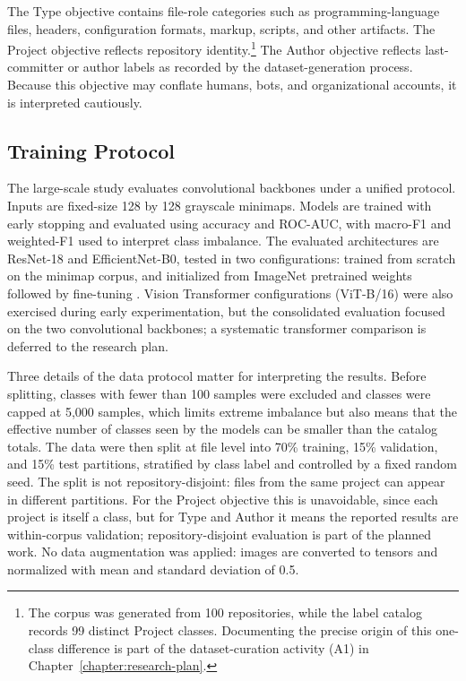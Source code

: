The Type objective contains file-role categories such as programming-language
files, headers, configuration formats, markup, scripts, and other artifacts. The
Project objective reflects repository identity.\footnote{The corpus was
generated from 100 repositories, while the label catalog records 99 distinct
Project classes. Documenting the precise origin of this one-class difference is
part of the dataset-curation activity (A1) in
Chapter~\ref{chapter:research-plan}.} The Author objective reflects
last-committer or author labels as recorded by the dataset-generation process.
Because this objective may conflate humans, bots, and organizational accounts,
it is interpreted cautiously.

\subsection{Training Protocol}

The large-scale study evaluates convolutional backbones under a unified
protocol. Inputs are fixed-size 128 by 128 grayscale minimaps. Models are
trained with early stopping and evaluated using accuracy and ROC-AUC, with
macro-F1 and weighted-F1 used to interpret class imbalance. The evaluated
architectures are ResNet-18 and EfficientNet-B0, tested in two
configurations: trained from scratch on the minimap corpus, and initialized
from ImageNet pretrained weights followed by fine-tuning
\cite{he2016resnet,tan2019efficientnet}. Vision Transformer configurations
(ViT-B/16) were also exercised during early experimentation, but the
consolidated evaluation focused on the two convolutional backbones; a
systematic transformer comparison is deferred to the research plan.

Three details of the data protocol matter for interpreting the results. Before splitting, classes with
fewer than 100 samples were excluded and classes were capped at 5,000 samples,
which limits extreme imbalance but also means that the effective number of
classes seen by the models can be smaller than the catalog totals. The data
were then split at file level into 70\% training, 15\% validation, and 15\%
test partitions, stratified by class label and controlled by a fixed random
seed. The split is not repository-disjoint: files from the same project can
appear in different partitions. For the Project objective this is unavoidable,
since each project is itself a class, but for Type and Author it means the
reported results are within-corpus validation; repository-disjoint evaluation
is part of the planned work. No data augmentation was applied: images are
converted to tensors and normalized with mean and standard deviation of 0.5.

